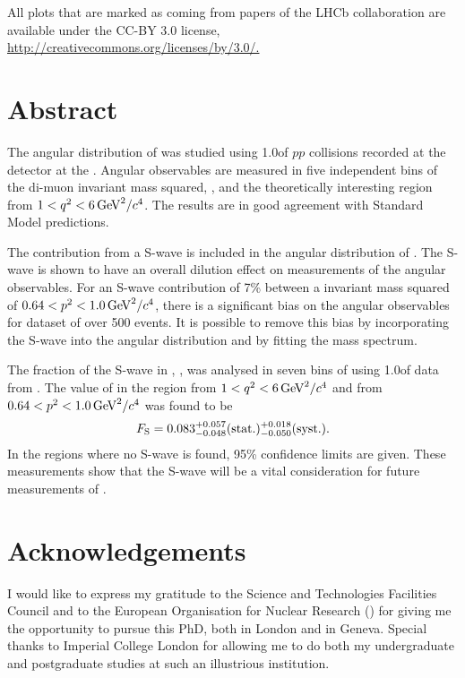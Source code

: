 \vspace*{\fill}

{\scriptsize All plots that are marked as coming from papers of the LHCb collaboration are available 
 under the CC-BY 3.0 license, \href{http://creativecommons.org/licenses/by/3.0/}{http://creativecommons.org/licenses/by/3.0/.}  
 }

\doublepage


\chapter*{Abstract}

The angular distribution of \BdToKstmm was studied using  
1.0\invfb of $pp$ collisions recorded at the \lhcb detector at the \lhc.
Angular observables are measured in five independent bins of the di-muon invariant mass squared, \qsq, 
and the theoretically interesting region from $1 < q^2 < 6 \mathrm{\,Ge\kern -0.1em V}^{2} / c^{4} $.
The results are in good agreement with Standard Model predictions.

The contribution from a \kpi S-wave is included in the angular distribution of \BdToKpill.
The \kpi S-wave is shown to have an overall dilution effect on measurements of the \BdToKpill angular observables. 
For an S-wave contribution of 7\% between a \kpi invariant mass squared of $0.64<p^2<1.0\mathrm{\,Ge\kern -0.1em V}^{2} / c^{4} $, there is a significant 
bias on the angular observables for dataset of over 500 events.
It is possible to remove this bias by incorporating the S-wave into the angular distribution
 and by fitting the \kpi mass spectrum. 

The fraction of the S-wave in \BdToKstmm, \FS, was analysed in seven bins of \qsq using 1.0\invfb of data from \lhcb.
The value of \FS in the region from $1 < q^2 < 6 \mathrm{\,Ge\kern -0.1em V}^{2} / c^{4} $  and from $0.64<p^2<1.0\mathrm{\,Ge\kern -0.1em V}^{2} / c^{4} $ 
was found to be $$F_{\mathrm{S}} = 0.083^{+0.057}_{-0.048}(\mathrm{stat.})^{+0.018}_{-0.050} (\mathrm{syst.}).$$
In the regions where no S-wave is found, 95\% confidence limits are given.
These measurements show that the  \kpi S-wave will be a vital consideration for future measurements of \BdToKstll.

\doublepage


\chapter*{Acknowledgements}

I would like to express my gratitude to the Science and Technologies Facilities Council 
and to the European Organisation for Nuclear Research (\cern) for giving me the opportunity to pursue this PhD,
both in London and in Geneva.
Special thanks to Imperial College London for allowing me to do both my undergraduate and postgraduate studies at
such an illustrious institution. %

